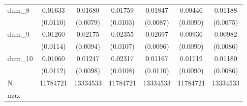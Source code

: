 {\begin{tabular}{l*{6}{c}}
dum\_8       &     0.01633         &     0.01680\sym{**} &     0.01759\sym{*}  &     0.01847\sym{**} &     0.00446         &     0.01188         \\
            &    (0.0110)         &    (0.0079)         &    (0.0103)         &    (0.0087)         &    (0.0090)         &    (0.0075)         \\
dum\_9       &     0.01260         &     0.02175\sym{**} &     0.02355\sym{**} &     0.02697\sym{***}&     0.00936         &     0.00982         \\
            &    (0.0114)         &    (0.0094)         &    (0.0107)         &    (0.0096)         &    (0.0090)         &    (0.0086)         \\
dum\_10      &     0.01060         &     0.01247         &     0.02317\sym{**} &     0.01167         &     0.01719\sym{*}  &     0.01180         \\
            &    (0.0112)         &    (0.0098)         &    (0.0108)         &    (0.0110)         &    (0.0090)         &    (0.0086)         \\
\midrule
N           &    11784721         &    13334533         &    11784721         &    13334533         &    11784721         &    13334533         \\
max         &                     &                     &                     &                     &                     &                     \\
\bottomrule
\end{tabular}
}
